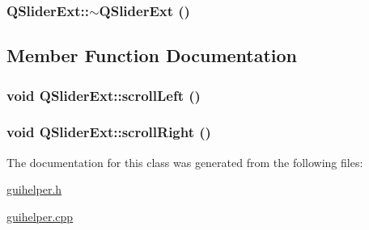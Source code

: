 \hypertarget{class_q_slider_ext_3914f975e99b626eef6a2cc394aae511}{
\subsubsection[{$\sim$QSliderExt}]{\setlength{\rightskip}{0pt plus 5cm}QSliderExt::$\sim$QSliderExt ()}}
\label{class_q_slider_ext_3914f975e99b626eef6a2cc394aae511}




\subsection{Member Function Documentation}
\hypertarget{class_q_slider_ext_6901a38010159323854101e31306e420}{
\subsubsection[{scrollLeft}]{\setlength{\rightskip}{0pt plus 5cm}void QSliderExt::scrollLeft ()}}
\label{class_q_slider_ext_6901a38010159323854101e31306e420}


\hypertarget{class_q_slider_ext_69fcb3e8939cbf5945b52e5851549a45}{
\subsubsection[{scrollRight}]{\setlength{\rightskip}{0pt plus 5cm}void QSliderExt::scrollRight ()}}
\label{class_q_slider_ext_69fcb3e8939cbf5945b52e5851549a45}




The documentation for this class was generated from the following files:\begin{CompactItemize}
\item 
\hyperlink{guihelper_8h}{guihelper.h}\item 
\hyperlink{guihelper_8cpp}{guihelper.cpp}\end{CompactItemize}
